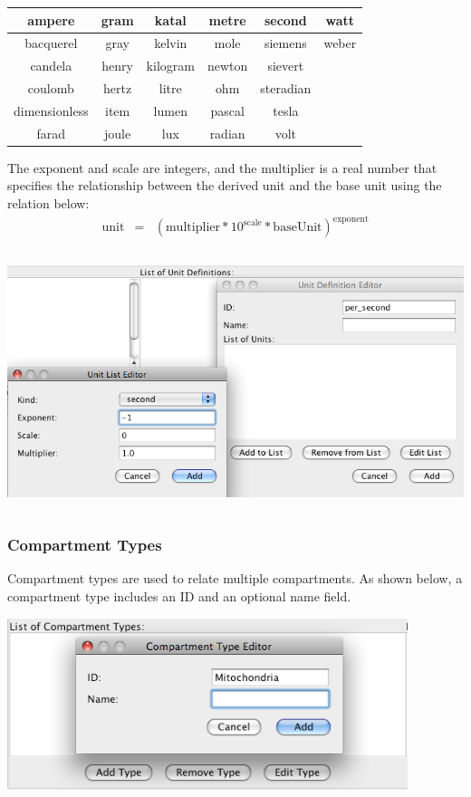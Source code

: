 \documentclass[titlepage,11pt]{article}
\begin{document}
\begin{center}
\begin{tabular}{|c|c|c|c|c|c|}
\hline
ampere        & gram  & katal    & metre  & second    & watt \\ \hline
bacquerel     & gray  & kelvin   & mole   & siemens   & weber \\ \hline
candela       & henry & kilogram & newton & sievert   & ~\\ \hline
coulomb       & hertz & litre    & ohm    & steradian & ~\\ \hline
dimensionless & item  & lumen    & pascal & tesla     & ~\\ \hline
farad         & joule & lux      & radian & volt      & ~\\ \hline
\end{tabular}
\end{center}

The exponent and scale are integers, and the multiplier is a real
number that specifies the relationship between the derived unit and the
base unit using the relation below:
\begin{eqnarray*}
\mathrm{unit} & = & (\mathrm{multiplier} * 10^\mathrm{scale} * \mathrm{baseUnit})^\mathrm{exponent}
\end{eqnarray*}
\begin{center}
\includegraphics[height=75mm]{screenshots/units}
\end{center}

\subsubsection{\label{compTypes}Compartment Types}

\noindent
Compartment types are used to relate multiple compartments.  As shown
below, a compartment type includes an ID and an optional name field.
\begin{center}
\includegraphics[height=50mm]{screenshots/compType}
\end{center}
\end{document}
